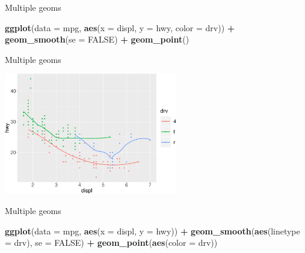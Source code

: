 \documentclass[ignorenonframetext,]{beamer}
\newenvironment{Shaded}{\begin{snugshade}}{\end{snugshade}}
\newcommand{\DataTypeTok}[1]{\textcolor[rgb]{0.13,0.29,0.53}{#1}}
\newcommand{\KeywordTok}[1]{\textcolor[rgb]{0.13,0.29,0.53}{\textbf{#1}}}
\newcommand{\NormalTok}[1]{#1}
\newcommand{\OperatorTok}[1]{\textcolor[rgb]{0.81,0.36,0.00}{\textbf{#1}}}
\newcommand{\OtherTok}[1]{\textcolor[rgb]{0.56,0.35,0.01}{#1}}
\newcommand{\StringTok}[1]{\textcolor[rgb]{0.31,0.60,0.02}{#1}}
\begin{document}
\begin{frame}[fragile]{Multiple geoms}
\protect\hypertarget{multiple-geoms-10}{}

\begin{Shaded}
\begin{Highlighting}[]
\KeywordTok{ggplot}\NormalTok{(}\DataTypeTok{data =}\NormalTok{ mpg, }
       \KeywordTok{aes}\NormalTok{(}\DataTypeTok{x =}\NormalTok{ displ, }\DataTypeTok{y =}\NormalTok{ hwy, }\DataTypeTok{color =}\NormalTok{ drv)) }\OperatorTok{+}\StringTok{ }
\StringTok{  }\KeywordTok{geom_smooth}\NormalTok{(}\DataTypeTok{se =} \OtherTok{FALSE}\NormalTok{) }\OperatorTok{+}
\StringTok{  }\KeywordTok{geom_point}\NormalTok{()}
\end{Highlighting}
\end{Shaded}

\end{frame}

\begin{frame}{Multiple geoms}
\protect\hypertarget{multiple-geoms-11}{}

\begin{center}\includegraphics[height=200px]{data-visualization_files/figure-beamer/unnamed-chunk-89-1} \end{center}

\end{frame}

\begin{frame}[fragile]{Multiple geoms}
\protect\hypertarget{multiple-geoms-12}{}

\begin{Shaded}
\begin{Highlighting}[]
\KeywordTok{ggplot}\NormalTok{(}\DataTypeTok{data =}\NormalTok{ mpg, }\KeywordTok{aes}\NormalTok{(}\DataTypeTok{x =}\NormalTok{ displ, }\DataTypeTok{y =}\NormalTok{ hwy)) }\OperatorTok{+}
\StringTok{   }\KeywordTok{geom_smooth}\NormalTok{(}\KeywordTok{aes}\NormalTok{(}\DataTypeTok{linetype =}\NormalTok{ drv), }\DataTypeTok{se =} \OtherTok{FALSE}\NormalTok{) }\OperatorTok{+}
\StringTok{   }\KeywordTok{geom_point}\NormalTok{(}\KeywordTok{aes}\NormalTok{(}\DataTypeTok{color =}\NormalTok{ drv))}
\end{Highlighting}
\end{Shaded}

\end{frame}
\end{document}
